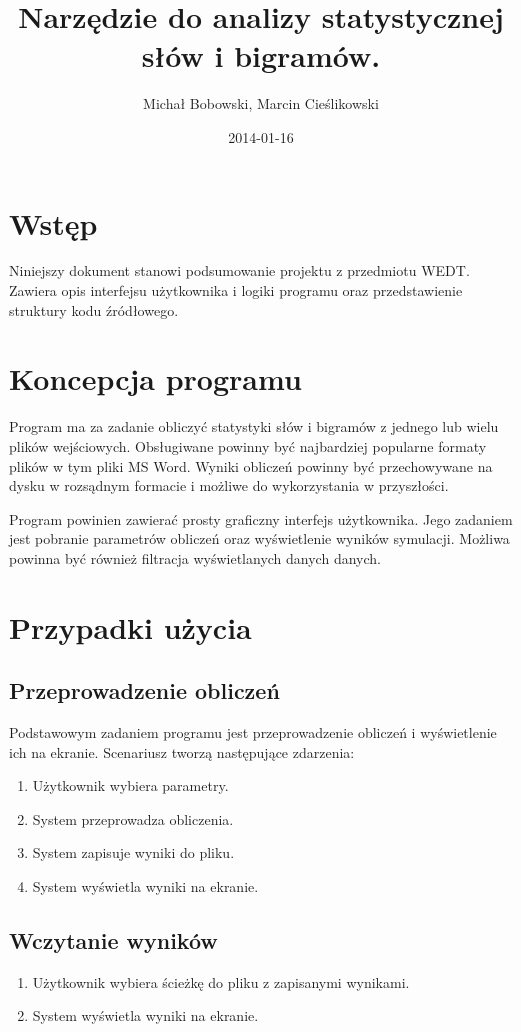 \documentclass[11pt]{article}
\author{Michał Bobowski, Marcin Cieślikowski}
\date{2014-01-16}
\title{Narzędzie do analizy statystycznej słów i bigramów.}
\begin{document}
  \maketitle

\section{Wstęp}
Niniejszy dokument stanowi podsumowanie projektu z przedmiotu WEDT.
Zawiera opis interfejsu użytkownika i logiki programu oraz przedstawienie struktury kodu źródłowego.

\section{Koncepcja programu}
Program ma za zadanie obliczyć statystyki słów i bigramów z jednego lub wielu plików wejściowych.
Obsługiwane powinny być najbardziej popularne formaty plików w tym pliki MS Word.
Wyniki obliczeń powinny być przechowywane na dysku w rozsądnym formacie i możliwe do wykorzystania w przyszłości.

Program powinien zawierać prosty graficzny interfejs użytkownika.
Jego zadaniem jest pobranie parametrów obliczeń oraz wyświetlenie wyników symulacji.
Możliwa powinna być również filtracja wyświetlanych danych danych.

\section{Przypadki użycia}
\subsection{Przeprowadzenie obliczeń}
Podstawowym zadaniem programu jest przeprowadzenie obliczeń i wyświetlenie ich na ekranie.
Scenariusz tworzą następujące zdarzenia:
\begin{enumerate}
 \item Użytkownik wybiera parametry.
 \item System przeprowadza obliczenia.
 \item System zapisuje wyniki do pliku.
 \item System wyświetla wyniki na ekranie.
\end{enumerate}

\subsection{Wczytanie wyników}
\begin{enumerate}
 \item Użytkownik wybiera ścieżkę do pliku z zapisanymi wynikami.
 \item System wyświetla wyniki na ekranie.
\end{enumerate}
\end{document}
